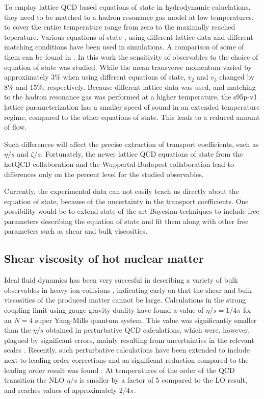 To employ lattice QCD based equations of state in hydrodynamic caluclations, they need to be matched to a hadron resonance gas model at low temperatures, to cover the entire temperature range from zero to the maximally reached teperature. Various equations of state \cite{Huovinen:2009yb, Borsanyi:2013bia, Bazavov:2014pvz}, using different lattice data and different matching conditions have been used in simulations. A comparison of some of them can be found in \cite{Moreland:2015dvc}. In this work the sensitivity of observables to the choice of equation of state was studied. While the mean transverse momentum varied by approximately 3\% when using different equations of state, $v_2$ and $v_3$ changed by 8\% and 15\%, respectively. Because different lattice data was used, and matching to the hadron resonance gas was performed at a higher temperature, the s95p-v1 lattice parameterization has a smaller speed of sound in an extended temperature regime, compared to the other equations of state. This leads to a reduced amount of flow. 

Such differences will affect the precise extraction of transport coefficients, such as $\eta/s$ and $\zeta/s$. Fortunately, the newer lattice QCD equations of state from the hotQCD collaboration \cite{Bazavov:2014pvz} and the Wuppertal-Budapest collaboration \cite{Borsanyi:2013bia} lead to differences only on the percent level for the studied observables.

Currently, the experimental data can not easily teach us directly about the equation of state, because of the uncertainty in the transport coefficients. One possibility would be to extend state of the art Bayesian techniques \cite{Moreland:2018gsh} to include free parameters describing the equation of state and fit them along with other free parameters such as shear and bulk viscosities. 

\subsection{Shear viscosity of hot nuclear matter}
Ideal fluid dynamics has been very succesful in describing a variety of bulk observables in heavy ion collisions \cite{Kolb:2003dz,Huovinen:2003fa,Hirano:2002ds}, indicating early on that the shear and bulk viscosities of the produced matter cannot be large. Calculations in the strong coupling limit using gauge gravity duality have found a value of $\eta/s=1/4\pi$ for an $N = 4$ super Yang-Mills quantum system. This value was significantly smaller than the $\eta/s$ obtained in perturbative QCD calculations, which were, however, plagued by significant errors, mainly resulting from uncertainties in the relevant scales \cite{Arnold:2003zc}. Recently, such perturbative calculations have been extended to include next-to-leading order corrections and aa significant reduction compared to the leading order result was found \cite{Ghiglieri:2018dgf}: At temperatures of the order of the QCD transition the NLO $\eta/s$ is smaller by a factor of $5$ compared to the LO result, and reaches values of approximately $2/4\pi$. 


